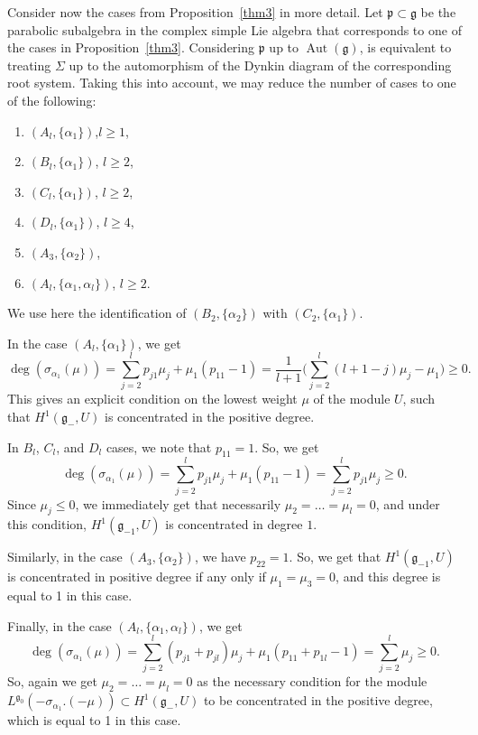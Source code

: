 \documentclass[pdftex]{sigma}%
\newcommand{\g}{\mathfrak g}
\newcommand{\pf}{\mathfrak p}
\newcommand{\Aut}{\operatorname{Aut}}
\numberwithin{equation}{section}
\begin{document}
Consider now the cases from Proposition~\ref{thm3} in more detail. Let $\pf\subset\g$ be the parabolic subalgebra in the complex simple Lie algebra that corresponds to one of the cases in Proposition~\ref{thm3}. Considering $\pf$ up to $\Aut(\g)$, is equivalent to treating $\Sigma$ up to the automorphism of the Dynkin diagram of the corresponding root system. Taking this into account, we may reduce the number of cases to one of the following:
\begin{enumerate}\itemsep=0pt
\item $(A_l,\{\alpha_1\})$,\quad $l\ge 1$,
\item $(B_l,\{\alpha_1\})$, \quad$l\ge 2$,
\item $(C_l,\{\alpha_1\})$, \quad$l\ge 2$,
\item $(D_l,\{\alpha_1\})$, \quad$l\ge 4$,
\item $(A_3,\{\alpha_2\})$,
\item $(A_l,\{\alpha_1,\alpha_l\})$, \quad$l\ge 2$.
\end{enumerate}
We use here the identification of $(B_2,\{\alpha_2\})$ with $(C_2,\{\alpha_1\})$.

In the case $(A_l,\{\alpha_1\})$, we get
\[
\deg(\sigma_{\alpha_1}(\mu))=
 \sum_{j=2}^l p_{j1}\mu_j + \mu_1(p_{11}-1) =
 \frac{1}{l+1}\bigg(\sum_{j=2}^l (l+1-j)\mu_j - \mu_1\bigg) \ge 0.
\]
This gives an explicit condition on the lowest weight $\mu$ of the module $U$, such that $H^1(\g_{-},U)$ is concentrated in the positive degree.

In $B_l$, $C_l$, and $D_l$ cases, we note that $p_{11}=1$. So, we get
\[
	\deg(\sigma_{\alpha_1}(\mu)) = \sum_{j=2}^l p_{j1}\mu_j + \mu_1(p_{11}-1)
	= \sum_{j=2}^l p_{j1}\mu_j \ge 0.
\]
Since $\mu_j\le 0$, we immediately get that necessarily $\mu_2=\dots=\mu_l=0$, and under this condition, $H^1(\g_{-1},U)$ is concentrated in degree $1$.

Similarly, in the case $(A_3,\{\alpha_2\})$, we have $p_{22}=1$. So, we get that $H^1(\g_{-1},U)$ is concentrated in positive degree if any only if $\mu_1=\mu_3=0$, and this degree is equal to 1 in this case.

Finally, in the case $(A_l,\{\alpha_1,\alpha_l\})$, we get
\[
	\deg(\sigma_{\alpha_1}(\mu)) =
	\sum_{j=2}^{l} (p_{j1}+p_{jl})\mu_j + \mu_1(p_{11}+p_{1l}-1)
	= \sum_{j=2}^{l} \mu_j \ge 0.
\]
So, again we get $\mu_2=\dots=\mu_l=0$ as the necessary condition for the module $L^{\g_0}(-\sigma_{\alpha_1}.(-\mu))\subset H^1(\g_{-},U)$ to be concentrated in the positive degree, which is equal to 1 in this case.
\end{document}
